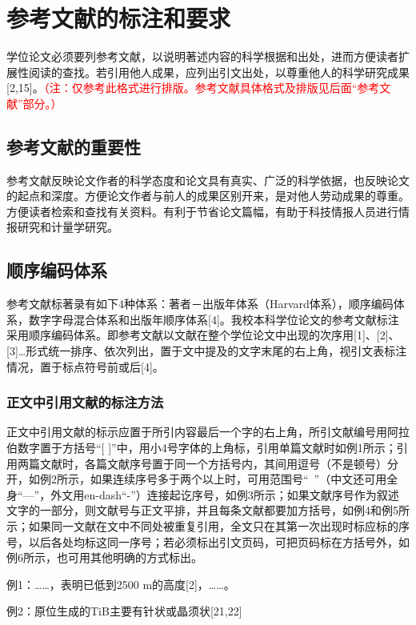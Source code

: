 \chapter{参考文献的标注和要求}

学位论文必须要列参考文献，以说明著述内容的科学根据和出处，进而方便读者扩展性阅读的查找。若引用他人成果，应列出引文出处，以尊重他人的科学研究成果[2,15]。\textcolor{red}{（注：仅参考此格式进行排版。参考文献具体格式及排版见后面“参考文献”部分。）}

\section{参考文献的重要性}

参考文献反映论文作者的科学态度和论文具有真实、广泛的科学依据，也反映论文的起点和深度。方便论文作者与前人的成果区别开来，是对他人劳动成果的尊重。方便读者检索和查找有关资料。有利于节省论文篇幅，有助于科技情报人员进行情报研究和计量学研究。

\section{顺序编码体系}

参考文献标著录有如下4种体系：著者－出版年体系（Harvard体系），顺序编码体系，数字字母混合体系和出版年顺序体系[4]。我校本科学位论文的参考文献标注采用顺序编码体系。即参考文献以文献在整个学位论文中出现的次序用[1]、[2]、[3]…形式统一排序、依次列出，置于文中提及的文字末尾的右上角，视引文表标注情况，置于标点符号前或后[4]。

\subsection{正文中引用文献的标注方法}

正文中引用文献的标示应置于所引内容最后一个字的右上角，所引文献编号用阿拉伯数字置于方括号“[ ]”中，用小4号字体的上角标，引用单篇文献时如例1所示；引用两篇文献时，各篇文献序号置于同一个方括号内，其间用逗号（不是顿号）分开，如例2所示，如果连续序号多于两个以上时，可用范围号“~”（中文还可用全身“—”，外文用en-dash“-”）连接起讫序号，如例3所示；如果文献序号作为叙述文字的一部分，则文献号与正文平排，并且每条文献都要加方括号，如例4和例5所示；如果同一文献在文中不同处被重复引用，全文只在其第一次出现时标应标的序号，以后各处均标这同一序号；若必须标出引文页码，可把页码标在方括号外，如例6所示，也可用其他明确的方式标出。

例1：……，表明已低到2500 m的高度[2]，……。

例2：原位生成的TiB主要有针状或晶须状[21,22]

